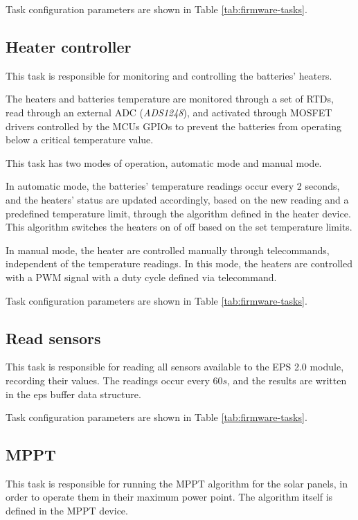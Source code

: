 Task configuration parameters are shown in Table \ref{tab:firmware-tasks}.

\subsection{Heater controller}

This task is responsible for monitoring and controlling the batteries' heaters.

The heaters and batteries temperature are monitored through a set of RTDs, read through an external ADC (\textit{ADS1248}), and activated through MOSFET drivers controlled by the MCUs GPIOs to prevent the batteries from operating below a critical temperature value.

This task has two modes of operation, automatic mode and manual mode.

In automatic mode, the batteries' temperature readings occur every 2 seconds, and the heaters' status are updated accordingly, based on the new reading and a predefined temperature limit, through the algorithm defined in the heater device.
This algorithm switches the heaters on of off based on the set temperature limits.

In manual mode, the heater are controlled manually through telecommands, independent of the temperature readings. In this mode, the heaters are controlled with a PWM signal with a duty cycle defined via telecommand.

Task configuration parameters are shown in Table \ref{tab:firmware-tasks}.

\subsection{Read sensors}

This task is responsible for reading all sensors available to the EPS 2.0 module, recording their values.
The readings occur every \(60 s\), and the results are written in the eps buffer data structure.

Task configuration parameters are shown in Table \ref{tab:firmware-tasks}.

\subsection{MPPT}

This task is responsible for running the MPPT algorithm for the solar panels, in order to operate them in their maximum power point.
The algorithm itself is defined in the MPPT device.

